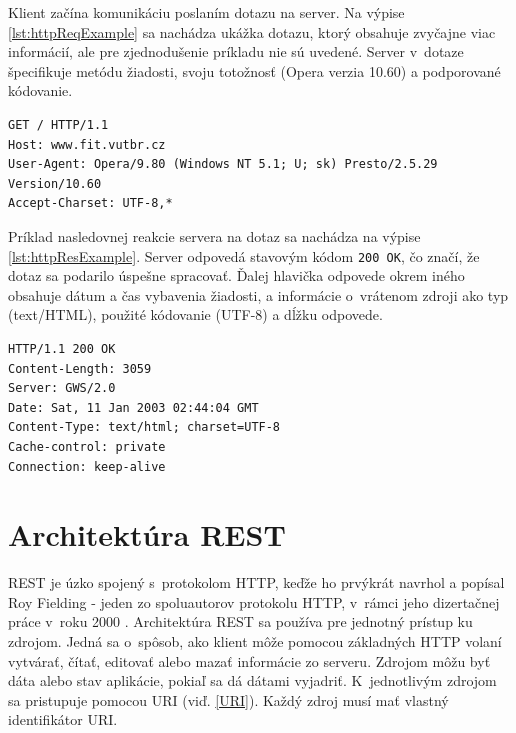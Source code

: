 \documentclass[zadani,slovak]{fitthesis}
\begin{document}
Klient začína komunikáciu poslaním dotazu na server. Na výpise \ref{lst:httpReqExample} sa nachádza ukážka dotazu, ktorý obsahuje zvyčajne viac informácií, ale pre zjednodušenie príkladu nie sú uvedené. Server v~dotaze špecifikuje metódu žiadosti, svoju totožnosť (Opera verzia 10.60) a podporované kódovanie.
\begin{lstlisting}[caption=príklad HTTP dotazu,frame=tlrb,label={lst:httpReqExample}]
GET / HTTP/1.1
Host: www.fit.vutbr.cz
User-Agent: Opera/9.80 (Windows NT 5.1; U; sk) Presto/2.5.29 Version/10.60
Accept-Charset: UTF-8,*
\end{lstlisting}
Príklad nasledovnej reakcie servera na dotaz sa nachádza na výpise \ref{lst:httpResExample}. Server odpovedá stavovým kódom \texttt{200 OK}, čo značí, že dotaz sa podarilo úspešne spracovať. Ďalej hlavička odpovede okrem iného obsahuje dátum a čas vybavenia žiadosti, a informácie o~vrátenom zdroji ako typ (text/HTML), použité kódovanie (UTF-8) a dĺžku odpovede. 
\begin{lstlisting}[caption=príklad HTTP odpovedi,frame=tlrb,label={lst:httpResExample}]
HTTP/1.1 200 OK
Content-Length: 3059
Server: GWS/2.0
Date: Sat, 11 Jan 2003 02:44:04 GMT
Content-Type: text/html; charset=UTF-8
Cache-control: private
Connection: keep-alive
\end{lstlisting}



\section{Architektúra REST}\label{rest}
REST je úzko spojený s~protokolom HTTP, keďže ho prvýkrát navrhol a popísal Roy Fielding - jeden zo spoluautorov protokolu HTTP, v~rámci jeho dizertačnej práce v~roku 2000 \cite{dizertackaREST}.
Architektúra REST sa používa pre jednotný prístup ku zdrojom. Jedná sa o~spôsob, ako klient môže pomocou základných HTTP volaní vytvárať, čítať, editovať alebo mazať informácie zo serveru. Zdrojom môžu byť dáta alebo stav aplikácie, pokiaľ sa dá dátami vyjadriť. K~jednotlivým zdrojom sa pristupuje pomocou URI (viď. \ref{URI}). Každý zdroj musí mať vlastný identifikátor URI.
\end{document}

